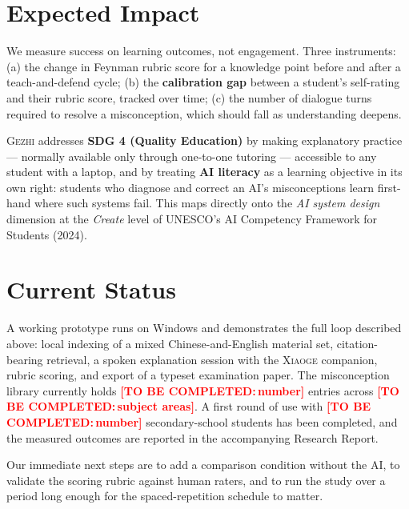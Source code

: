 \documentclass[10pt,a4paper]{article}
\newcommand{\gezhi}{\textsc{Gezhi}}
\newcommand{\xiaoge}{\textsc{Xiaoge}}
\newcommand{\fillin}[1]{\textcolor{red}{\textbf{[TO BE COMPLETED:\,#1]}}}
\begin{document}
\section{Expected Impact}

We measure success on learning outcomes, not engagement. Three instruments: (a) the change
in Feynman rubric score for a knowledge point before and after a teach-and-defend cycle;
(b) the \textbf{calibration gap} between a student's self-rating and their rubric score,
tracked over time; (c) the number of dialogue turns required to resolve a misconception,
which should fall as understanding deepens.

\gezhi{} addresses \textbf{SDG 4 (Quality Education)} by making explanatory practice ---
normally available only through one-to-one tutoring --- accessible to any student with a
laptop, and by treating \textbf{AI literacy} as a learning objective in its own right:
students who diagnose and correct an AI's misconceptions learn first-hand where such systems
fail. This maps directly onto the \emph{AI system design} dimension at the \emph{Create}
level of UNESCO's AI Competency Framework for Students (2024).

\section{Current Status}

A working prototype runs on Windows and demonstrates the full loop described above:
local indexing of a mixed Chinese-and-English material set, citation-bearing retrieval, a
spoken explanation session with the \xiaoge{} companion, rubric scoring, and export of a
typeset examination paper. The misconception library currently holds \fillin{number}
entries across \fillin{subject areas}. A first round of use with \fillin{number}
secondary-school students has been completed, and the measured outcomes are reported in the
accompanying Research Report.

Our immediate next steps are to add a comparison condition without the AI, to validate the
scoring rubric against human raters, and to run the study over a period long enough for the
spaced-repetition schedule to matter.
\end{document}
